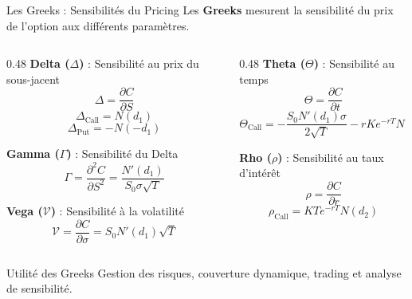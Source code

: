 \documentclass[aspectratio=169, 10pt]{beamer}
\begin{document}
\begin{frame}{Les Greeks : Sensibilités du Pricing}
    Les \textbf{Greeks} mesurent la sensibilité du prix de l'option aux différents paramètres.
    
    \vspace{0.3cm}
    \begin{columns}[T]
        \begin{column}{0.48\textwidth}
            \textbf{Delta ($\Delta$)} : Sensibilité au prix du sous-jacent
            $$\Delta = \frac{\partial C}{\partial S}$$
            $$\Delta_{\text{Call}} = N(d_1)$$
            $$\Delta_{\text{Put}} = -N(-d_1)$$
            
            \vspace{0.2cm}
            \textbf{Gamma ($\Gamma$)} : Sensibilité du Delta
            $$\Gamma = \frac{\partial^2 C}{\partial S^2} = \frac{N'(d_1)}{S_0 \sigma \sqrt{T}}$$
            
            \vspace{0.2cm}
            \textbf{Vega ($\mathcal{V}$)} : Sensibilité à la volatilité
            $$\mathcal{V} = \frac{\partial C}{\partial \sigma} = S_0 N'(d_1) \sqrt{T}$$
        \end{column}
        \begin{column}{0.48\textwidth}
            \textbf{Theta ($\Theta$)} : Sensibilité au temps
            $$\Theta = \frac{\partial C}{\partial t}$$
            $$\Theta_{\text{Call}} = -\frac{S_0 N'(d_1) \sigma}{2\sqrt{T}} - rK e^{-rT} N(d_2)$$
            
            \vspace{0.2cm}
            \textbf{Rho ($\rho$)} : Sensibilité au taux d'intérêt
            $$\rho = \frac{\partial C}{\partial r}$$
            $$\rho_{\text{Call}} = K T e^{-rT} N(d_2)$$
        \end{column}
    \end{columns}
    
    \vspace{0.3cm}
    \begin{block}{Utilité des Greeks}
    Gestion des risques, couverture dynamique, trading et analyse de sensibilité.
    \end{block}
\end{frame}
\end{document}
